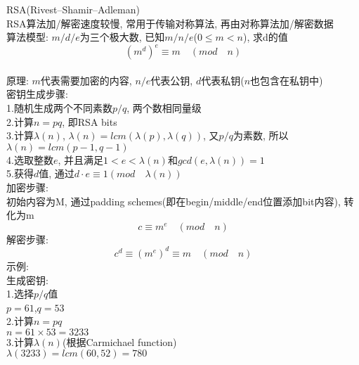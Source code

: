 \documentclass[UTF8, fontset=ubuntu]{ctexart}
\begin{document}
\hangindent=1cm RSA(Rivest–Shamir–Adleman)\\
    RSA算法加/解密速度较慢, 常用于传输对称算法, 再由对称算法加/解密数据\\
    算法模型: $m/d/e$为三个极大数, 已知$m/n/e$($0\leqslant m<n$), 求d的值\\
    \[(m^d)^e \equiv m\quad(mod\quad n)\]\\
    原理: $m$代表需要加密的内容, $n/e$代表公钥, $d$代表私钥($n$也包含在私钥中)\\
    密钥生成步骤:\\
        \phantom{\hspace{1cm}}1.随机生成两个不同素数$p/q$, 两个数相同量级\\
	\phantom{\hspace{1cm}}2.计算$n=pq$, 即RSA bits\\
	\phantom{\hspace{1cm}}3.计算$\lambda(n)$, $\lambda(n)=lcm(\lambda(p),\lambda(q))$, 又$p/q$为素数, 所以$\lambda(n)=lcm(p-1,q-1)$\\
        \phantom{\hspace{1cm}}4.选取整数$e$, 并且满足$1<e<\lambda(n)$和$gcd(e,\lambda(n))=1$\\
	\phantom{\hspace{1cm}}5.获得$d$值, 通过$d\cdot e\equiv 1(mod\quad\lambda(n))$\\[2ex]
    加密步骤:\\
	\phantom{\hspace{1cm}}初始内容为M, 通过padding schemes(即在begin/middle/end位置添加bit内容), 转化为m
        \[c\equiv m^e\quad(mod\quad n)\]
    解密步骤:\\
        \[c^d\equiv(m^e)^d\equiv m\quad(mod\quad n)\]
    示例:\\
    生成密钥:\\
    \phantom{\hspace{1cm}}1.选择$p/q$值\\
    \phantom{\hspace{2cm}}$p=61$,$q=53$\\
    \phantom{\hspace{1cm}}2.计算$n=pq$\\
    \phantom{\hspace{2cm}}$n=61\times 53=3233$\\
    \phantom{\hspace{1cm}}3.计算$\lambda(n)$(根据Carmichael function)\\
    \phantom{\hspace{2cm}}$\lambda(3233)=lcm(60,52)=780$\\
\end{document}
